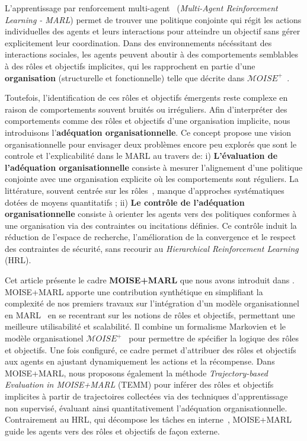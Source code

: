 \documentclass[dissemination]{jfsma}
\begin{document}
L'apprentissage par renforcement multi-agent~\cite{maisonhaute2024} (\textit{Multi-Agent Reinforcement Learning - MARL}) permet de trouver une politique conjointe qui régit les actions individuelles des agents et leurs interactions pour atteindre un objectif sans gérer explicitement leur coordination. Dans des environnements nécéssitant des interactions sociales, les agents peuvent aboutir à des comportements semblables à des rôles et objectifs implicites, qui les rapprochent en partie d'une \textbf{organisation} (structurelle et fonctionnelle) telle que décrite dans $\mathcal{M}OISE^+$~\cite{Hubner2007}.

Toutefois, l’identification de ces rôles et objectifs émergents reste complexe en raison de comportements souvent bruités ou irréguliers. Afin d’interpréter des comportements comme des rôles et objectifs d'une organisation implicite, nous introduisons l’\textbf{adéquation organisationnelle}.
Ce concept propose une vision organisationnelle pour envisager deux problèmes encore peu explorés que sont le controle et l'explicabilité dans le MARL au travers de:
i) \textbf{L'évaluation de l'adéquation organisationnelle} consiste à mesurer l'alignement d'une politique conjointe avec une organisation explicite où les comportements sont réguliers. La littérature, souvent centrée sur les rôles~\cite{Isakov2024, Wen2024, Xie2024}, manque d'approches systématiques dotées de moyens quantitatifs
 ; \quad
ii) \textbf{Le contrôle de l'adéquation organisationnelle} consiste à orienter les agents vers des politiques conformes à une organisation via des contraintes ou incitations définies. Ce contrôle induit la réduction de l'espace de recherche, l'amélioration de la convergence et le respect des contraintes de sécurité, sans recourir au \textit{Hierarchical Reinforcement Learning} (HRL).

\noindent Cet article présente le cadre \textbf{MOISE+MARL} que nous avons introduit dans \cite{soule2025moisemarl}. MOISE+MARL apporte une contribution synthétique en simplifiant la complexité de nos premiers travaux sur l'intégration d'un modèle organisationnel en MARL~\cite{soule2024paper-jfsma, soule2024aomea} en se recentrant sur les notions de rôles et objectifs, permettant une meilleure utilisabilité et scalabilité. Il combine un formalisme Markovien et le modèle organisationel $\mathcal{M}OISE^+$~\cite{Hubner2007} pour permettre de spécifier la logique des rôles et objectifs. Une fois configuré, ce cadre permet d'attribuer des rôles et objectifs aux agents en ajustant dynamiquement les actions et la récompense. Dans MOISE+MARL, nous proposons également la méthode \textit{Trajectory-based Evaluation in MOISE+MARL} (TEMM) pour inférer des rôles et objectifs implicites à partir de trajectoires collectées via des techniques d'apprentissage non supervisé, évaluant ainsi quantitativement l'adéquation organisationnelle. Contrairement au HRL, qui décompose les tâches en interne~\cite{Qi2024, Matsuyama2025, SaoMai2024}, MOISE+MARL guide les agents vers des rôles et objectifs de façon externe.
\end{document}
